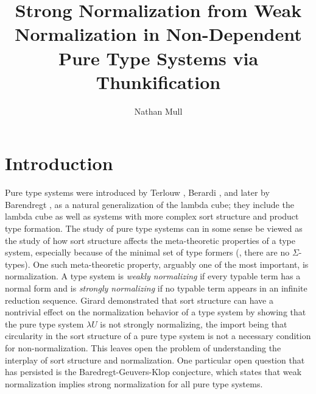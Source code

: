 \documentclass{article}
\title{Strong Normalization from Weak Normalization in Non-Dependent Pure Type Systems via Thunkification}
\author{Nathan Mull}
\begin{document}
\maketitle


\section{Introduction}

Pure type systems were introduced by Terlouw \cite{terlouw-1989}, Berardi \cite{berardi-1988}, and later by Barendregt \cite{barendregt-1991, barendregt-1993}, as a natural generalization of the lambda cube; they include the lambda cube as well as systems with more complex sort structure and product type formation.
The study of pure type systems can in some sense be viewed as the study of how sort structure affects the meta-theoretic properties of a type system, especially because of the minimal set of type formers (\eg, there are no $\Sigma$-types).
One such meta-theoretic property, arguably one of the most important, is normalization.
A type system is \textit{weakly normalizing} if every typable term has a normal form and is \textit{strongly normalizing} if no typable term appears in an infinite reduction sequence.
Girard \cite{girard-1972} demonstrated that sort structure can have a nontrivial effect on the normalization behavior of a type system by showing that the pure type system $\lambda U$ is not strongly normalizing, the import being that circularity in the sort structure of a pure type system is not a necessary condition for non-normalization.
This leaves open the problem of understanding the interplay of sort structure and normalization.
One particular open question that has persisted is the Baredregt-Geuvers-Klop conjecture, which states that weak normalization implies strong normalization for all pure type systems.
\end{document}
